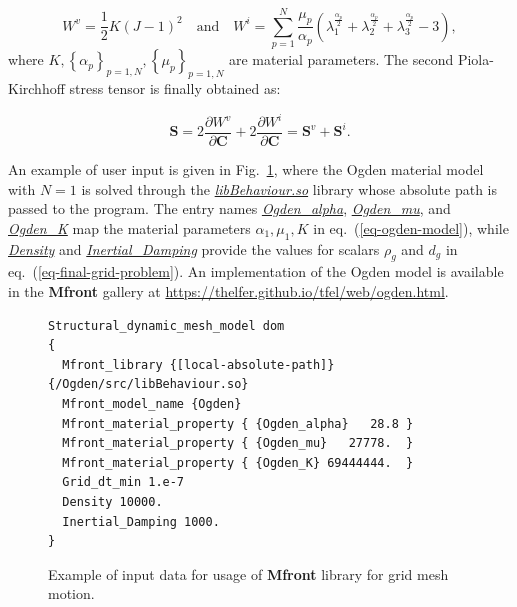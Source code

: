 \begin{equation}
  \label{eq-ogden-model}
     W^v = \frac{1}{2}K (J - 1)^2 \quad \text{and} \quad 
     W^i = \displaystyle \sum_{p=1}^{N} \frac{\mu_p}{\alpha_p} \left ( \lambda_1^{\frac{\alpha_p}{2}} + \lambda_2^{\frac{\alpha_p}{2}} + \lambda_3^{\frac{\alpha_p}{2}} - 3 \right ),
\end{equation}
\noindent where $K, \left \{ \alpha_p \right \}_{p=1,N}, \left \{ \mu_p \right \}_{p=1,N}$ are material parameters.
The second Piola-Kirchhoff stress tensor is finally obtained as:

\begin{equation}
    \mathbf{S} = 2 \frac{\partial W^v}{\partial \mathbf{C}} + 2 \frac{\partial W^i}{\partial \mathbf{C}} = \mathbf{S}^v + \mathbf{S}^i.
\end{equation}

An example of user input is given in Fig.~\ref{fig-triocfd-mfront-data}, where the Ogden material model with $N=1$ is solved through the \underline{\textit{libBehaviour.so}} library whose absolute path is passed to the program. The entry names \underline{\textit{Ogden\_alpha}}, \underline{\textit{Ogden\_mu}}, and \underline{\textit{Ogden\_K}} map the material parameters $\alpha_1, \mu_1, K$ in eq.~(\ref{eq-ogden-model}), while \underline{\textit{Density}} and \underline{\textit{Inertial\_Damping}} provide the values for scalars $\rho_g$ and $d_g$ in eq.~(\ref{eq-final-grid-problem}). An implementation of the Ogden model is available in the \textbf{Mfront} gallery at \url{https://thelfer.github.io/tfel/web/ogden.html}.




\begin{figure}[H]
\lstset{language=C++,
        basicstyle=\footnotesize,
        frame = single
}
\begin{lstlisting}
Structural_dynamic_mesh_model dom
{
  Mfront_library {[local-absolute-path]}{/Ogden/src/libBehaviour.so}
  Mfront_model_name {Ogden}
  Mfront_material_property { {Ogden_alpha}   28.8 }
  Mfront_material_property { {Ogden_mu}   27778.  }
  Mfront_material_property { {Ogden_K} 69444444.  }
  Grid_dt_min 1.e-7
  Density 10000.
  Inertial_Damping 1000.
}
\end{lstlisting}
\caption{Example of input data for usage of \textbf{Mfront} library for grid mesh motion.}
\label{fig-triocfd-mfront-data}
\end{figure}

